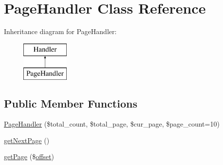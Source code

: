 \hypertarget{classPageHandler}{}\section{Page\+Handler Class Reference}
\label{classPageHandler}
Inheritance diagram for Page\+Handler\+:\begin{figure}[H]
\begin{center}
\leavevmode
\includegraphics[height=2.000000cm]{classPageHandler}
\end{center}
\end{figure}
\subsection*{Public Member Functions}
\begin{DoxyCompactItemize}
\item 
\hyperlink{classPageHandler_a98c8fc6b290d49c3880c323b263fe7e7}{Page\+Handler} (\$total\+\_\+count, \$total\+\_\+page, \$cur\+\_\+page, \$page\+\_\+count=10)
\item 
\hyperlink{classPageHandler_a259d01838d005d854d4cc263ba524de7}{get\+Next\+Page} ()
\item 
\hyperlink{classPageHandler_a971f178609a0dd6e1a0fd07daa94782d}{get\+Page} (\$\hyperlink{jquery-1_8x_8js_a4a9f594d20d927164551fc7fa4751a2f}{offset})
\end{DoxyCompactItemize}
